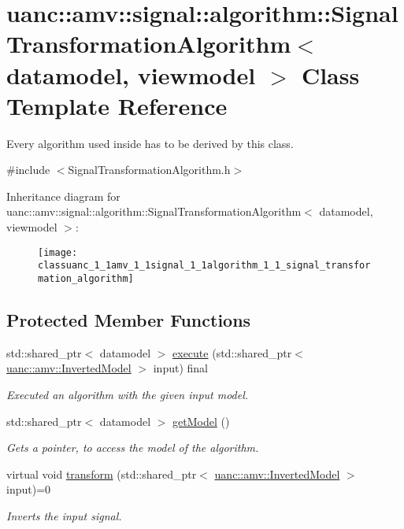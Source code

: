 \hypertarget{classuanc_1_1amv_1_1signal_1_1algorithm_1_1_signal_transformation_algorithm}{}\section{uanc\+:\+:amv\+:\+:signal\+:\+:algorithm\+:\+:Signal\+Transformation\+Algorithm$<$ datamodel, viewmodel $>$ Class Template Reference}
\label{classuanc_1_1amv_1_1signal_1_1algorithm_1_1_signal_transformation_algorithm}


Every algorithm used inside has to be derived by this class.  




{\ttfamily \#include $<$Signal\+Transformation\+Algorithm.\+h$>$}

Inheritance diagram for uanc\+:\+:amv\+:\+:signal\+:\+:algorithm\+:\+:Signal\+Transformation\+Algorithm$<$ datamodel, viewmodel $>$\+:\begin{figure}[H]
\begin{center}
\leavevmode
\texttt{[image: classuanc\_1\_1amv\_1\_1signal\_1\_1algorithm\_1\_1\_signal\_transformation\_algorithm]}
\end{center}
\end{figure}
\subsection*{Protected Member Functions}
\begin{DoxyCompactItemize}
\item 
std\+::shared\+\_\+ptr$<$ datamodel $>$ \hyperlink{classuanc_1_1amv_1_1signal_1_1algorithm_1_1_signal_transformation_algorithm_a7118b46dcfdadf8648cf927c4bdd70d0}{execute} (std\+::shared\+\_\+ptr$<$ \hyperlink{classuanc_1_1amv_1_1_inverted_model}{uanc\+::amv\+::\+Inverted\+Model} $>$ input) final
\begin{DoxyCompactList}\small\item\em Executed an algorithm with the given input model. \end{DoxyCompactList}\item 
std\+::shared\+\_\+ptr$<$ datamodel $>$ \hyperlink{classuanc_1_1amv_1_1signal_1_1algorithm_1_1_signal_transformation_algorithm_acb59a47bcaf75198a7f5e3a2f1392942}{get\+Model} ()
\begin{DoxyCompactList}\small\item\em Gets a pointer, to access the model of the algorithm. \end{DoxyCompactList}\item 
virtual void \hyperlink{classuanc_1_1amv_1_1signal_1_1algorithm_1_1_signal_transformation_algorithm_a40dee2d59e84244373cacc9c472514d6}{transform} (std\+::shared\+\_\+ptr$<$ \hyperlink{classuanc_1_1amv_1_1_inverted_model}{uanc\+::amv\+::\+Inverted\+Model} $>$ input)=0
\begin{DoxyCompactList}\small\item\em Inverts the input signal. \end{DoxyCompactList}\end{DoxyCompactItemize}
